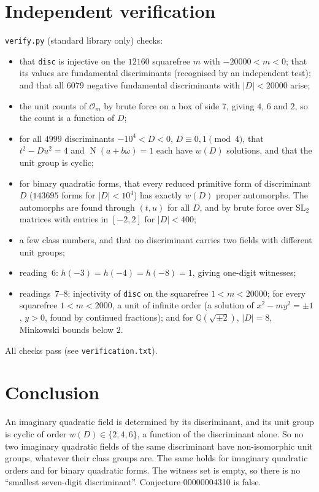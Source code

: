 \documentclass[11pt]{article}
\theoremstyle{definition}
\theoremstyle{remark}
\newcommand{\Q}{\mathbb{Q}}
\newcommand{\OO}{\mathcal{O}}
\newcommand{\Nm}{\operatorname{N}}
\begin{document}
\section{Independent verification}
\texttt{verify.py} (standard library only) checks:
\begin{itemize}
\item that \texttt{disc} is injective on the $12160$ squarefree $m$ with $-20000<m<0$; that its
values are fundamental discriminants (recognised by an independent test); and that all $6079$
negative fundamental discriminants with $|D|<20000$ arise;
\item the unit counts of $\OO_m$ by brute force on a box of side 7, giving $4$, $6$ and $2$, so
the count is a function of $D$;
\item for all $4999$ discriminants $-10^4<D<0$, $D\equiv0,1\pmod4$, that $t^2-Du^2=4$ and
$\Nm(a+b\omega)=1$ each have $w(D)$ solutions, and that the unit group is cyclic;
\item for binary quadratic forms, that every reduced primitive form of discriminant $D$
($143695$ forms for $|D|<10^4$) has exactly $w(D)$ proper automorphs. The automorphs are found
through $(t,u)$ for all $D$, and by brute force over $\mathrm{SL}_2$ matrices with entries in
$[-2,2]$ for $|D|<400$;
\item a few class numbers, and that no discriminant carries two fields with different unit groups;
\item reading~6: $h(-3)=h(-4)=h(-8)=1$, giving one-digit witnesses;
\item readings~7--8: injectivity of \texttt{disc} on the squarefree $1<m<20000$; for every
squarefree $1<m<2000$, a unit of infinite order (a solution of $x^2-my^2=\pm1$, $y>0$, found by
continued fractions); and for $\Q(\sqrt{\pm2})$, $|D|=8$, Minkowski bounds below $2$.
\end{itemize}
All checks pass (see \texttt{verification.txt}).

\section{Conclusion}
An imaginary quadratic field is determined by its discriminant, and its unit group is cyclic of
order $w(D)\in\{2,4,6\}$, a function of the discriminant alone. So no two imaginary quadratic
fields of the same discriminant have non-isomorphic unit groups, whatever their class groups
are. The same holds for imaginary quadratic orders and for binary quadratic forms. The witness
set is empty, so there is no ``smallest seven-digit discriminant''. Conjecture 00000004310 is
false.
\end{document}
